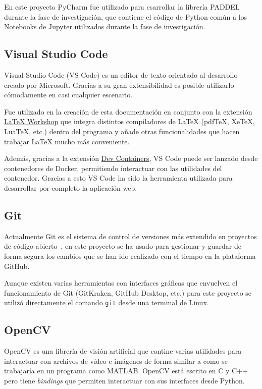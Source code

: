 En este proyecto PyCharm fue utilizado para esarrollar la librería PADDEL
durante la fase de investigación, que contiene el código de Python común a los
Notebooks de Jupyter utilizados durante la fase de investigación.

\subsection{Visual Studio Code}

Visual Studio Code (VS Code) es un editor de texto orientado al desarrollo
creado por Microsoft. Gracias a su gran extensibilidad es posible utilizarlo
cómodamente en casi cualquier escenario.

Fue utilizado en la creación de esta documentación en conjunto con la extensión
\href{https://github.com/James-Yu/LaTeX-Workshop}{\LaTeX{} Workshop} que integra
distintos compiladores de \LaTeX{} (pdfTeX, XeTeX, LuaTeX, etc.) dentro del
programa y añade otras funcionalidades que hacen trabajar \LaTeX{} mucho más
conveniente.

Además, gracias a la extensión
\href{https://marketplace.visualstudio.com/items?itemName=ms-vscode-remote.remote-containers}{Dev
Containers}, VS Code puede ser lanzado desde contenedores de Docker, permitiendo
interactuar con las utilidades del contenedor. Gracias a esto VS Code ha sido la
herramienta utilizada para desarrollar por completo la aplicación web.

\subsection{Git}

Actualmente Git es el sistema de control de versiones más extendido en proyectos
de código abierto~\cite{OpenHubVCS}, en este proyecto se ha usado para gestionar
y guardar de forma segura los cambios que se han ido realizado con el tiempo en
la plataforma GitHub.

Aunque existen varias herramientas con interfaces gráficas que envuelven el
funcionamiento de Git (GitKraken, GitHub Desktop, etc.) para este proyecto se
utilizó directamente el comando \texttt{git} desde una terminal de Linux.

\subsection{OpenCV}

OpenCV es una librería de visión artificial que contine varias utilidades para
interactuar con archivos de vídeo e imágenes de forma similar a como se
trabajaría en un programa como MATLAB\@. OpenCV está escrito en C y C++ pero tiene
\textit{bindings} que permiten interactuar con sus interfaces desde Python.

